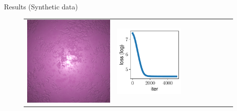 \documentclass[final]{beamer}
\newlength{\twocolwid}
\newlength{\resultwidth}
\begin{document}
\begin{frame}[t]
\begin{columns}[t]
\begin{column}{\twocolwid}
\begin{block}{Results (Synthetic data)}
\begin{figure}[t]
\begin{tabular}{ccrclcccc}
            		\includegraphics[width=\resultwidth]{synth/plaster/target.jpg} &
            		\includegraphics[width=\resultwidth]{synth/plaster/loss.pdf} &

\end{tabular}
\end{figure}
\end{block}
\end{column}
\end{columns}
\end{frame}
\end{document}
